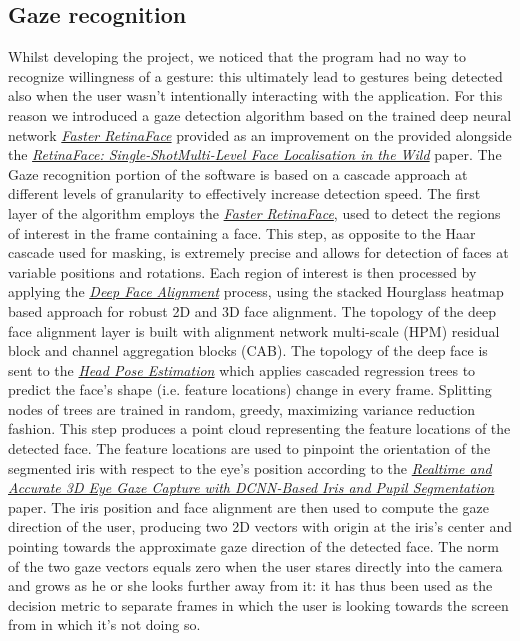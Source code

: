 \documentclass[a4paper, 12pt]{article}
\begin{document}
\subsection{Gaze recognition}
\label{GazeRec}
Whilst developing the project, we noticed that the program had no way to recognize willingness of a gesture: this ultimately lead to gestures being detected also when the user wasn't intentionally interacting with the application. For this reason we introduced a gaze detection algorithm based on the trained deep neural network \textit{\hyperref[Ref12]{Faster RetinaFace}} provided as an improvement on the provided alongside the \textit{\hyperref[Ref4]{RetinaFace: Single-ShotMulti-Level Face Localisation in the Wild}} paper.
The Gaze recognition portion of the software is based on a cascade approach at different levels of granularity to effectively increase detection speed.
The first layer of the algorithm employs the \textit{\hyperref[Ref12]{Faster RetinaFace}}, used to detect the regions of interest in the frame containing a face. This step, as opposite to the Haar cascade used for masking, is extremely precise and allows for detection of faces at variable positions and rotations.\linebreak
Each region of interest is then processed by applying the \textit{\hyperref[Ref13]{Deep Face Alignment}} process, using the  stacked Hourglass heatmap based approach for robust 2D and 3D face alignment. The topology of the deep face alignment layer is built with alignment network multi-scale (HPM) residual block and channel aggregation blocks (CAB).
The topology of the deep face is sent to the \textit{\hyperref[Ref14]{Head Pose Estimation}} which applies cascaded regression trees to predict the face's shape (i.e. feature locations) change in every frame. Splitting nodes of trees are trained in random, greedy, maximizing variance reduction fashion. This step produces a point cloud representing the feature locations of the detected face.\linebreak
The feature locations are used to pinpoint the orientation of the segmented iris with respect to the eye's position according to the \textit{\hyperref[Ref7]{Realtime and Accurate 3D Eye Gaze Capture with DCNN-Based Iris and Pupil Segmentation}} paper.
The iris position and face alignment are then used to compute the gaze direction of the user, producing two 2D vectors with origin at the iris's center and pointing towards the approximate gaze direction of the detected face.\linebreak
The norm of the two gaze vectors equals zero when the user stares directly into the camera and grows as he or she looks further away from it: it has thus been used as the decision metric to separate frames in which the user is looking towards the screen from in which it's not doing so.
\end{document}
